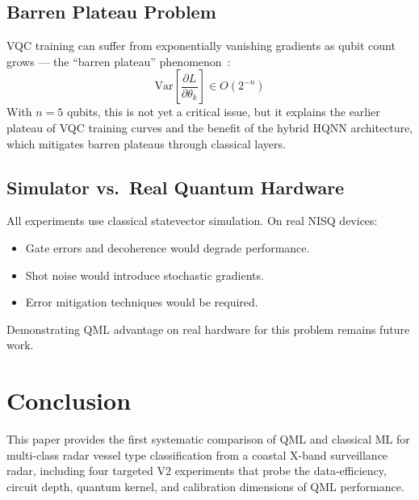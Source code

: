 \documentclass[journal]{IEEEtran}
\begin{document}
\subsection{Barren Plateau Problem}

VQC training can suffer from exponentially vanishing gradients as qubit count
grows — the ``barren plateau'' phenomenon~\cite{mcclean2018barren}:
\begin{equation}
  \text{Var}\!\left[\frac{\partial L}{\partial \theta_k}\right] \in O(2^{-n})
\end{equation}
With $n=5$ qubits, this is not yet a critical issue, but it explains the
earlier plateau of VQC training curves and the benefit of the hybrid HQNN
architecture, which mitigates barren plateaus through classical layers.

\subsection{Simulator vs.\ Real Quantum Hardware}

All experiments use classical statevector simulation. On real NISQ devices:
\begin{itemize}
  \item Gate errors and decoherence would degrade performance.
  \item Shot noise would introduce stochastic gradients.
  \item Error mitigation techniques would be required.
\end{itemize}
Demonstrating QML advantage on real hardware for this problem remains future work.

\section{Conclusion}

This paper provides the first systematic comparison of QML and classical ML for
multi-class radar vessel type classification from a coastal X-band surveillance
radar, including four targeted V2 experiments that probe the data-efficiency,
circuit depth, quantum kernel, and calibration dimensions of QML performance.
\end{document}
